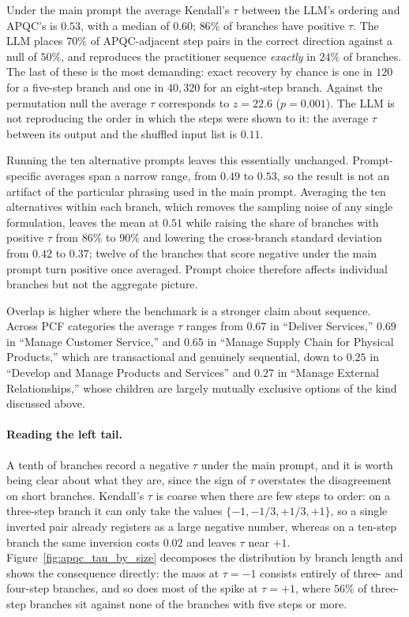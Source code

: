 Under the main prompt the average Kendall's $\tau$ between the LLM's ordering and APQC's is $0.53$, with a median of $0.60$; $86\%$ of branches have positive $\tau$.
The LLM places $70\%$ of APQC-adjacent step pairs in the correct direction against a null of $50\%$, and reproduces the practitioner sequence \emph{exactly} in $24\%$ of branches.
The last of these is the most demanding: exact recovery by chance is one in $120$ for a five-step branch and one in $40{,}320$ for an eight-step branch.
Against the permutation null the average $\tau$ corresponds to $z = 22.6$ ($p = 0.001$).
The LLM is not reproducing the order in which the steps were shown to it: the average $\tau$ between its output and the shuffled input list is $0.11$.

Running the ten alternative prompts leaves this essentially unchanged.
Prompt-specific averages span a narrow range, from $0.49$ to $0.53$, so the result is not an artifact of the particular phrasing used in the main prompt.
Averaging the ten alternatives within each branch, which removes the sampling noise of any single formulation, leaves the mean at $0.51$ while raising the share of branches with positive $\tau$ from $86\%$ to $90\%$ and lowering the cross-branch standard deviation from $0.42$ to $0.37$; twelve of the branches that score negative under the main prompt turn positive once averaged.
Prompt choice therefore affects individual branches but not the aggregate picture.

Overlap is higher where the benchmark is a stronger claim about sequence.
Across PCF categories the average $\tau$ ranges from $0.67$ in ``Deliver Services,'' $0.69$ in ``Manage Customer Service,'' and $0.65$ in ``Manage Supply Chain for Physical Products,'' which are transactional and genuinely sequential, down to $0.25$ in ``Develop and Manage Products and Services'' and $0.27$ in ``Manage External Relationships,'' whose children are largely mutually exclusive options of the kind discussed above.

\paragraph{Reading the left tail.}
\label{app:apqc_validation_tail}
A tenth of branches record a negative $\tau$ under the main prompt, and it is worth being clear about what they are, since the sign of $\tau$ overstates the disagreement on short branches.
Kendall's $\tau$ is coarse when there are few steps to order: on a three-step branch it can only take the values $\{-1, -1/3, +1/3, +1\}$, so a single inverted pair already registers as a large negative number, whereas on a ten-step branch the same inversion costs $0.02$ and leaves $\tau$ near $+1$.
Figure~\ref{fig:apqc_tau_by_size} decomposes the distribution by branch length and shows the consequence directly: the mass at $\tau = -1$ consists entirely of three- and four-step branches, and so does most of the spike at $\tau = +1$, where $56\%$ of three-step branches sit against none of the branches with five steps or more.


